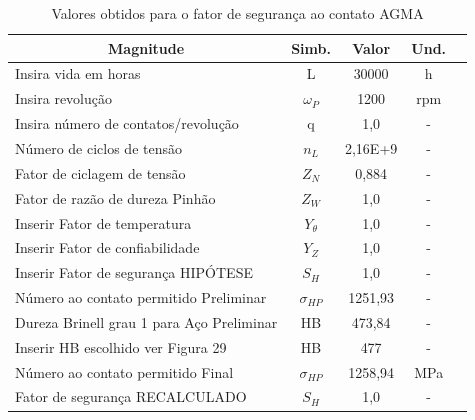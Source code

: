 \documentclass[12pt,a4paper]{article}
\begin{document}
\begin{table}[!htb]
\centering
\caption{{\label{tab:5} Valores obtidos para o fator de segurança ao contato AGMA}}
\begin{tabular}{l c c c c}
\hline
\multicolumn{1}{c}{\textbf{Magnitude}}    & \textbf{Simb.} & \textbf{Valor} & \textbf{Und.} \\ \hline
Insira vida em horas                      & L              & 30000          & h             \\
Insira revolução                          & $\omega_P$              & 1200           & rpm           \\
Insira número de contatos/revolução       & q              & 1,0              & -             \\
Número de ciclos de tensão                & $n_L$             & 2,16E+9        & -             \\
Fator de ciclagem de tensão               & $Z_N$             & 0,884          & -             \\
Fator de razão de dureza Pinhão           & $Z_W$             & 1,0              & -             \\
Inserir Fator de temperatura              & $Y_\theta$              & 1,0              & -             \\
Inserir Fator de confiabilidade           & $Y_Z$              & 1,0              & -             \\
Inserir Fator de segurança HIPÓTESE       & $S_H$             & 1,0              & -             \\
Número ao contato permitido Preliminar    & $\sigma_{HP}$             & 1251,93        & -             \\
Dureza Brinell grau 1 para Aço Preliminar & HB             & 473,84         & -             \\
Inserir HB escolhido ver Figura 29        & HB             & 477            & -             \\
Número ao contato permitido Final         & $\sigma_{HP}$             & 1258,94        & MPa           \\
Fator de segurança RECALCULADO            & $S_H$             & 1,0            & -    \\ \hline        
\end{tabular}
\end{table}

\subsection*{}
\end{document}

